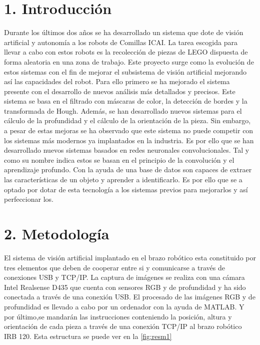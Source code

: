 {\section*{1. Introducción}
Durante los últimos dos años se ha desarrollado un sistema que dote de visión artificial y autonomía a los robots de Comillas ICAI. La tarea escogida para llevar a cabo con estos robots es la recolección de piezas de LEGO dispuesta de forma aleatoria en una zona de trabajo. Este proyecto surge como la evolución de estos sistemas con el fin de mejorar el subsistema de visión artificial mejorando así las capacidades del robot. Para ello primero se ha mejorado el sistema presente con el desarrollo de nuevos análisis más detallados y precisos. Este sistema se basa en el filtrado con máscaras de color, la detección de bordes y la transformada de Hough. Además, se han desarrollado nuevos sistemas para el cálculo de la profundidad y el cálculo de la orientación de la pieza. Sin embargo, a pesar de estas mejoras se ha observado que este sistema no puede competir con los sistemas más modernos ya implantados en la industria. Es por ello que se han desarrollado nuevos sistemas basados en redes neuronales convolucionales. Tal y como su nombre indica estos se basan en el principio de la convolución y el aprendizaje profundo. Con la ayuda de una base de datos son capaces de extraer las características de un objeto y aprender a identificarlo. Es por ello que se a optado por dotar de esta tecnología a los sistemas previos para mejorarlos y así perfeccionar los.

\section*{2. Metodología}
El sistema de visión artificial implantado en el brazo robótico esta constituido por tres elementos que deben de cooperar entre si y comunicarse a través de conexiones USB y TCP/IP. La captura de imágenes se realiza con una cámara Intel Realsense D435 que cuenta con sensores RGB y de profundidad y ha sido conectada a través de una conexión USB. El procesado de las imágenes RGB y de profundidad es llevado a cabo por un ordenador con la ayuda de MATLAB. Y por último,se mandarán las instrucciones conteniendo la posición, altura y orientación de cada pieza a través de una conexión TCP/IP al brazo robótico IRB 120. Esta estructura se puede ver en la \autoref{fig:resm1}


}
